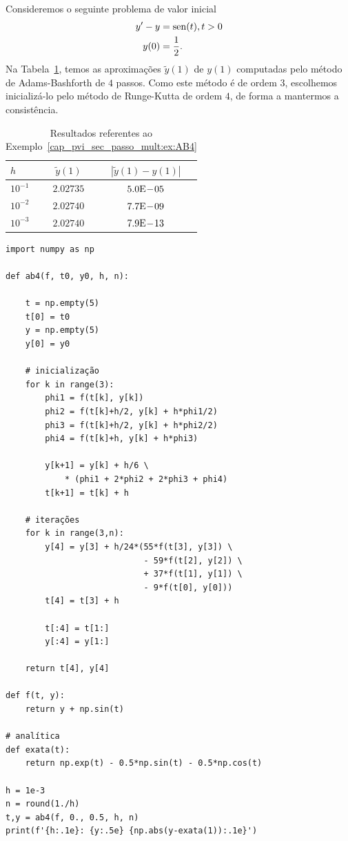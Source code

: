 \begin{ex}\label{cap_pvi_sec_passo_mult:ex:AB4}
  Consideremos o seguinte problema de valor inicial
  \begin{align}
    y' - y &= \operatorname{sen}(t), t>0\\
    y(0) &= \frac{1}{2}.
  \end{align}
  Na Tabela~\ref{cap_pvi_sec_passo_mult:tab:ex_AB4}, temos as aproximações $\tilde{y}(1)$ de $y(1)$ computadas pelo método de Adams-Bashforth de $4$ passos. Como este método é de ordem $3$, escolhemos inicializá-lo pelo método de Runge-Kutta de ordem $4$, de forma a mantermos a consistência.
 
  \begin{table}[H]
    \centering
    \caption{Resultados referentes ao Exemplo~\ref{cap_pvi_sec_passo_mult:ex:AB4}}
    \begin{tabular}{l|cc}
      $h$ & $\tilde{y}(1)$ & $|\tilde{y}(1)-y(1)|$\\\hline
      $10^{-1}$ & $2.02735$ & $5.0\mathrm{E}\!-\!05$ \\
      $10^{-2}$ & $2.02740$ & $7.7\mathrm{E}\!-\!09$ \\
      $10^{-3}$ & $2.02740$ & $7.9\mathrm{E}\!-\!13$ \\\hline
   \end{tabular}
    \label{cap_pvi_sec_passo_mult:tab:ex_AB4}
  \end{table}

\begin{lstlisting}[caption=ab4.py]
import numpy as np

def ab4(f, t0, y0, h, n):

    t = np.empty(5)
    t[0] = t0
    y = np.empty(5)
    y[0] = y0
    
    # inicialização
    for k in range(3):
        phi1 = f(t[k], y[k])
        phi2 = f(t[k]+h/2, y[k] + h*phi1/2)
        phi3 = f(t[k]+h/2, y[k] + h*phi2/2)
        phi4 = f(t[k]+h, y[k] + h*phi3)

        y[k+1] = y[k] + h/6 \
            * (phi1 + 2*phi2 + 2*phi3 + phi4)
        t[k+1] = t[k] + h

    # iterações
    for k in range(3,n):
        y[4] = y[3] + h/24*(55*f(t[3], y[3]) \
                            - 59*f(t[2], y[2]) \
                            + 37*f(t[1], y[1]) \
                            - 9*f(t[0], y[0]))
        t[4] = t[3] + h
        
        t[:4] = t[1:]
        y[:4] = y[1:]
        
    return t[4], y[4]

def f(t, y):
    return y + np.sin(t)

# analítica
def exata(t):
    return np.exp(t) - 0.5*np.sin(t) - 0.5*np.cos(t)

h = 1e-3
n = round(1./h)
t,y = ab4(f, 0., 0.5, h, n)
print(f'{h:.1e}: {y:.5e} {np.abs(y-exata(1)):.1e}')
\end{lstlisting}
\end{ex}

